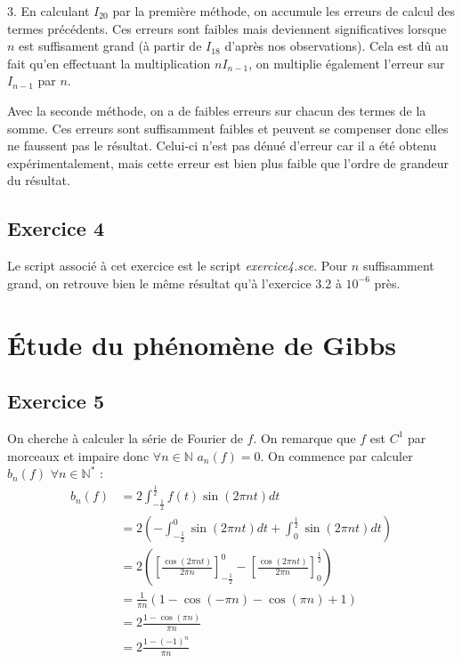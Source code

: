 \documentclass[a4paper,11pt]{article}
\begin{document}
	3. En calculant $I_{20}$ par la première méthode, on accumule les erreurs de calcul des termes précédents. Ces erreurs sont faibles mais deviennent significatives lorsque $n$ est suffisament grand (à partir de $I_{18}$ d'après nos observations). Cela est dû au fait qu'en effectuant la multiplication $nI_{n-1}$, on multiplie également l'erreur sur $I_{n-1}$ par $n$.
	
	Avec la seconde méthode, on a de faibles erreurs sur chacun des termes de la somme. Ces erreurs sont suffisamment faibles et peuvent se compenser donc elles ne faussent pas le résultat. Celui-ci n'est pas dénué d'erreur car il a été obtenu expérimentalement, mais cette erreur est bien plus faible que l'ordre de grandeur du résultat.

\subsection*{Exercice 4}
	Le script associé à cet exercice est le script \textit{exercice4.sce}. Pour $n$ suffisamment grand, on retrouve bien le même résultat qu'à l'exercice 3.2 à $10^{-6}$ près.


\section{Étude du phénomène de Gibbs}

\subsection*{Exercice 5}
	On cherche à calculer la série de Fourier de $f$. On remarque que $f$ est $C^{1}$ par morceaux et impaire donc $\forall n \in \mathbb{N} $ $a_{n}(f) = 0$.
	On commence par calculer $b_{n}(f)$ $\forall n \in \mathbb{N}^{*}$ :
	\begin{align*}
		b_{n}(f)
		& = 2 \int_{-\frac{1}{2}}^{\frac{1}{2}} f(t) \sin (2 \pi n t) dt \\
		& = 2 \left ( - \int_{-\frac{1}{2}}^{0} \sin (2 \pi n t) dt + \int_{0}^{\frac{1}{2}} \sin (2 \pi n t) dt \right ) \\
		& = 2 \left ( \left [ \frac{\cos ( 2 \pi n t)}{2 \pi n} \right ]_{-\frac{1}{2}}^{0} - \left [ \frac{\cos ( 2 \pi n t)}{2 \pi n} \right ]_{0}^{\frac{1}{2}} \right ) \\
		& = \frac{1}{\pi n} \left ( 1 - \cos (- \pi n) - \cos ( \pi n) + 1 \right ) \\
		& = 2 \frac{1 - \cos (\pi n)}{\pi n} \\
		& = 2 \frac{1-(-1)^{n}}{\pi n}
	\end{align*}
\end{document}
